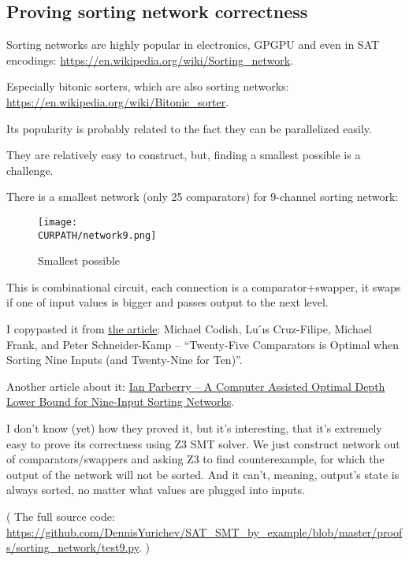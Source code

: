 \subsection{Proving sorting network correctness}

\renewcommand{\CURPATH}{proofs/sorting_network}

Sorting networks are highly popular in electronics, GPGPU and even in SAT encodings:
\url{https://en.wikipedia.org/wiki/Sorting_network}.

Especially bitonic sorters, which are also sorting networks:
\url{https://en.wikipedia.org/wiki/Bitonic_sorter}.

Its popularity is probably related to the fact they can be parallelized easily.

They are relatively easy to construct, but, finding a smallest possible is a challenge.

There is a smallest network (only 25 comparators) for 9-channel sorting network:

\begin{figure}[H]
\centering
\texttt{[image: \\CURPATH/network9.png]}
\caption{Smallest possible}
\end{figure}

This is combinational circuit, each connection is a comparator+swapper, it swaps if one of input values is bigger and passes output to the next level.

I copypasted it from \href{https://arxiv.org/pdf/1405.5754.pdf}{the article}:
Michael Codish, Lu ́ıs Cruz-Filipe, Michael Frank, and Peter Schneider-Kamp --
``Twenty-Five Comparators is Optimal when Sorting Nine Inputs (and Twenty-Nine for Ten)''.

Another article about it: \href{http://larc.unt.edu/ian/pubs/9-input.pdf}{Ian Parberry -- A Computer Assisted Optimal Depth Lower Bound for Nine-Input Sorting Networks}.

I don't know (yet) how they proved it, but it's interesting, that it's extremely easy to prove its correctness using Z3 SMT solver.
We just construct network out of comparators/swappers and asking Z3 to find counterexample, for which the output of the network will not be sorted.
And it can't, meaning, output's state is always sorted, no matter what values are plugged into inputs.



( The full source code: \url{https://github.com/DennisYurichev/SAT_SMT_by_example/blob/master/proofs/sorting_network/test9.py}. )


